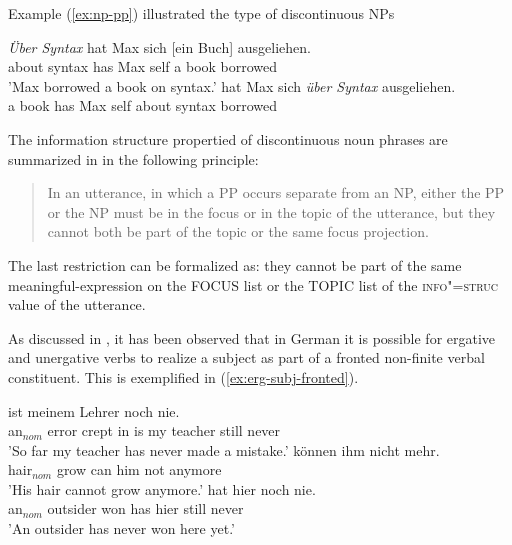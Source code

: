 \documentclass[output=paper]{langsci/langscibook}
\begin{document}
Example (\ref{ex:np-pp}) illustrated the type of discontinuous NPs 
\begin{exe}
  \ex\label{ex:np-pp} \begin{xlist}
    \ex\label{ex:simple-fronted-pp}\gll \textsl{Über Syntax} hat Max sich [ein
 Buch] ausgeliehen.\\
         {about syntax} has Max self { a} book borrowed\\
       \trans 'Max borrowed a book on syntax.'
    \ex\label{ex:simple-fronted-np} hat Max sich \textsl{über Syntax}    ausgeliehen.\\
 { a} book has Max self {about syntax} borrowed\\
\end{xlist}
\end{exe}

The information structure propertied of discontinuous noun phrases are
summarized in \cite{deKuthy2002a} in the following principle:
\begin{quote}
  In an utterance, in which a PP occurs separate from an NP, either
  the PP or the NP must be in the focus or in the topic of the
  utterance, but they cannot both be part of the topic or the same
  focus projection.
\end{quote}

The last restriction can be formalized as: they cannot be part of the
same meaningful-expression on the FOCUS list or the TOPIC list of the
\textsc{info"=struc} value of the utterance.

As discussed in \cite{dKM2003a}, it has been observed
that in German it is possible for ergative  and unergative verbs to realize a subject
as part of a fronted non-finite verbal constituent. This is
exemplified in (\ref{ex:erg-subj-fronted}).

\begin{exe}
\ex\label{ex:erg-subj-fronted}
  \begin{xlist}
  \ex\label{ex:erg-subj-fronted-indef} ist meinem Lehrer noch nie.\\
         {\LB}an$_{nom}$ error {crept in} is my teacher still never\\
         \trans 'So far my teacher has never made a mistake.'
  \ex{} können ihm nicht mehr.\\
          {\LB}hair$_{nom}$ grow can him not anymore\\
          \trans 'His hair cannot grow anymore.'
\ex\label{ex:nonerg-subj-fronted}
       hat hier noch nie.\\
           {\LB}an$_{nom}$ outsider won has hier still never\\
        \trans 'An outsider has never won here yet.'
  \end{xlist}
\end{exe}
\end{document}
